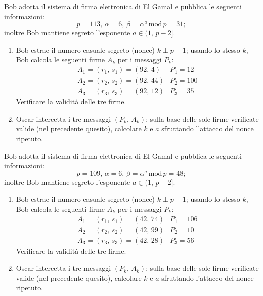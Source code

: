         Bob adotta il sistema di firma elettronica di El Gamal e pubblica le seguenti informazioni: \[
            p=113,\, \alpha = 6,\, \beta = \alpha^a\,\mathrm{mod}\,p=31
        ;\] inoltre Bob mantiene segreto l'esponente $a\in (1,\,p-2]$.
        \begin{enumerate}
            \item Bob estrae il numero casuale segreto (nonce) $k\perp p-1$; usando lo stesso $k$, 
                Bob calcola le seguenti firme $A_k$ per i messaggi $P_k$:
                \[\begin{array}{ll}
                    A_1=(r_1,\,s_1)=(92,\,4) & P_1=12\\
                    A_2=(r_2,\,s_2)=(92,\,44) & P_2=100\\
                    A_3=(r_3,\,s_3)=(92,\,12) & P_3=35
                \end{array}\]
                Verificare la validità delle tre firme.
            \item Oscar intercetta i tre messaggi $(P_k,\,A_k)$; sulla base delle sole firme verificate valide 
                (nel precedente quesito), calcolare $k$ e $a$ sfruttando l'attacco del nonce ripetuto.
        \end{enumerate}

        Bob adotta il sistema di firma elettronica di El Gamal e pubblica le seguenti informazioni: \[
            p=109,\, \alpha = 6,\, \beta = \alpha^a\,\mathrm{mod}\,p=48
        ;\] inoltre Bob mantiene segreto l'esponente $a\in (1,\,p-2]$.
        \begin{enumerate}
            \item Bob estrae il numero casuale segreto (nonce) $k\perp p-1$; usando lo stesso $k$, 
                Bob calcola le seguenti firme $A_k$ per i messaggi $P_k$:
                \[\begin{array}{ll}
                    A_1=(r_1,\,s_1)=(42,\,74) & P_1=106\\
                    A_2=(r_2,\,s_2)=(42,\,99) & P_2=10\\
                    A_3=(r_3,\,s_3)=(42,\,28) & P_3=56
                \end{array}\]
                Verificare la validità delle tre firme.
            \item Oscar intercetta i tre messaggi $(P_k,\,A_k)$; sulla base delle sole firme verificate valide 
                (nel precedente quesito), calcolare $k$ e $a$ sfruttando l'attacco del nonce ripetuto.
        \end{enumerate}

